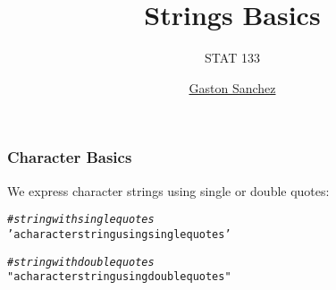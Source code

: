 \documentclass[12pt]{beamer}\usepackage[]{graphicx}\usepackage[]{color}
\title{Strings Basics}
\subtitle{STAT 133}
\author{\href{http://www.gastonsanchez.com}{Gaston Sanchez}}
\institute{\href{https://github.com/ucb-stat133/stat133-fall-2016}{\tt \scriptsize \color{foreground} github.com/ucb-stat133/stat133-fall-2016}}
\date{}
\makeatletter
\newcommand{\hlstr}[1]{\textcolor[rgb]{0.192,0.494,0.8}{#1}}%
\newcommand{\hlcom}[1]{\textcolor[rgb]{0.678,0.584,0.686}{\textit{#1}}}%
\newenvironment{kframe}{%
 \def\at@end@of@kframe{}%
 \ifinner\ifhmode%
  \def\at@end@of@kframe{\end{minipage}}%
  \begin{minipage}{\columnwidth}%
 \fi\fi%
 \def\FrameCommand##1{\hskip\@totalleftmargin \hskip-\fboxsep
 \colorbox{shadecolor}{##1}\hskip-\fboxsep
     \hskip-\linewidth \hskip-\@totalleftmargin \hskip\columnwidth}%
 \MakeFramed {\advance\hsize-\width
   \@totalleftmargin\z@ \linewidth\hsize
   \@setminipage}}%
 {\par\unskip\endMakeFramed%
 \at@end@of@kframe}
\newenvironment{knitrout}{}{} %
\makeatother
\begin{document}
{
  \frame{
    \titlepage
  } 
}


\begin{frame}
\begin{center}
\Huge{}
\end{center}
\end{frame}


\begin{frame}[fragile]
\frametitle{Character Basics}

We express character strings using single or double quotes:
\begin{knitrout}\footnotesize
{}\color{fgcolor}\begin{kframe}
\begin{alltt}
\hlcom{# string with single quotes}
\hlstr{'a character string using single quotes'}
\end{alltt}
\end{kframe}
\end{knitrout}

\begin{knitrout}\footnotesize
{}\color{fgcolor}\begin{kframe}
\begin{alltt}
\hlcom{# string with double quotes}
\hlstr{"a character string using double quotes"}
\end{alltt}
\end{kframe}
\end{knitrout}

\end{frame}

\end{document}

